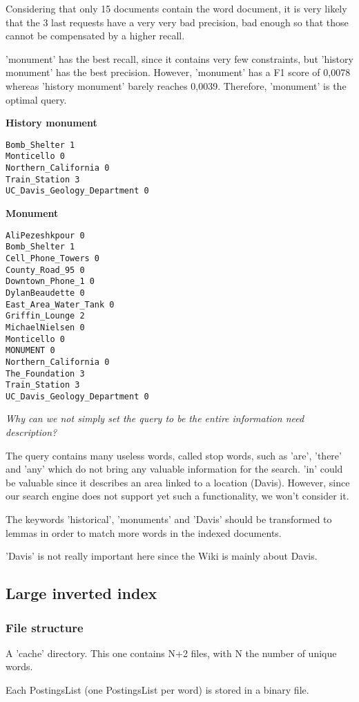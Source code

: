 Considering that only 15 documents contain the word document, it is very likely that the 3 last requests have a very very bad precision, bad enough so that those cannot be compensated by a higher recall.

'monument' has the best recall, since it contains very few constraints, but 'history monument' has the best precision.
However, 'monument' has a F1 score of 0,0078 whereas 'history monument' barely reaches 0,0039. Therefore, 'monument' is the optimal query.

\textbf{History monument}
\begin{verbatim}
Bomb_Shelter 1
Monticello 0
Northern_California 0
Train_Station 3
UC_Davis_Geology_Department 0
\end{verbatim}


\textbf{Monument}
\begin{verbatim}
AliPezeshkpour 0
Bomb_Shelter 1
Cell_Phone_Towers 0
County_Road_95 0
Downtown_Phone_1 0
DylanBeaudette 0
East_Area_Water_Tank 0
Griffin_Lounge 2
MichaelNielsen 0
Monticello 0
MONUMENT 0
Northern_California 0
The_Foundation 3
Train_Station 3
UC_Davis_Geology_Department 0
\end{verbatim}


\textit{Why can we not simply set the query to be the entire information need description?}

The query contains many useless words, called stop words, such as 'are', 'there' and 'any' which do not bring any valuable information for the search.
'in' could be valuable since it describes an area linked to a location (Davis). However, since our search engine does not support yet such a functionality, we won't consider it.

The keywords 'historical', 'monuments' and 'Davis' should be transformed to lemmas in order to match more words in the indexed documents.

'Davis' is not really important here since the Wiki is mainly about Davis.


\subsection{Large inverted index}
\subsubsection{File structure}
A 'cache' directory. This one contains N+2 files, with N the number of unique words.

Each PostingsList (one PostingsList per word) is stored in a binary file.

